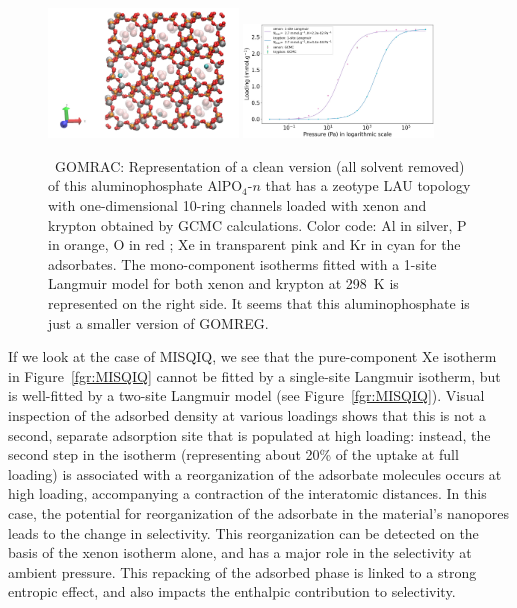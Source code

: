 \documentclass[main.tex]{subfiles}
\begin{document}
  \begin{figure}[h]
    \centering
      \includegraphics[width=0.45\textwidth]{figures/2-thermo/GOMRAC_clean.jpg}
      \includegraphics[width=0.45\textwidth]{figures/2-thermo/GOMRAC_clean_isotherm_xenon_krypton_298K.jpg}
      \caption{\ GOMRAC: Representation of a clean version (all solvent removed) of this aluminophosphate AlPO$_4$-$n$ that has a zeotype LAU topology with one-dimensional 10-ring channels loaded with xenon and krypton obtained by GCMC calculations. Color code: Al in silver, P in orange, O in red ; Xe in transparent pink and Kr in cyan for the adsorbates. The mono-component isotherms fitted with a 1-site Langmuir model for both xenon and krypton at \SI{298}{\kelvin} is represented on the right side. It seems that this aluminophosphate is just a smaller version of GOMREG.}
      \label{fgr:SI:examples:GOMRAC}
    \end{figure}

  If we look at the case of MISQIQ, we see that the pure-component Xe isotherm in Figure~\ref{fgr:MISQIQ} cannot be fitted by a single-site Langmuir isotherm, but is well-fitted by a two-site Langmuir model (see Figure~\ref{fgr:MISQIQ}). Visual inspection of the adsorbed density at various loadings shows that this is not a second, separate adsorption site that is populated at high loading: instead, the second step in the isotherm (representing about {20\%} of the uptake at full loading) is associated with a reorganization of the adsorbate molecules occurs at high loading, accompanying a contraction of the interatomic distances. In this case, the potential for reorganization of the adsorbate in the material's nanopores leads to the change in selectivity. This reorganization can be detected on the basis of the xenon isotherm alone, and has a major role in the selectivity at ambient pressure. This repacking of the adsorbed phase is linked to a strong entropic effect, and also impacts the enthalpic contribution to selectivity.
  
\end{document}
